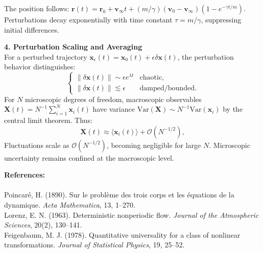 \begin{technical}
The position follows: $\mathbf{r}(t) = \mathbf{r}_0 + \mathbf{v}_\infty t + (m/\gamma)(\mathbf{v}_0 - \mathbf{v}_\infty)(1 - e^{-\gamma t/m})$. Perturbations decay exponentially with time constant $\tau = m/\gamma$, suppressing initial differences.

\textbf{4. Perturbation Scaling and Averaging}\\
For a perturbed trajectory $\mathbf{x}_\epsilon(t) = \mathbf{x}_0(t) + \epsilon \delta \mathbf{x}(t)$, the perturbation behavior distinguishes:
\[
\begin{cases}
\|\delta \mathbf{x}(t)\| \sim \epsilon e^{\lambda t} & \text{chaotic,} \\[0.5em]
\|\delta \mathbf{x}(t)\| \lesssim \epsilon & \text{damped/bounded.}
\end{cases}
\]
For $N$ microscopic degrees of freedom, macroscopic observables $\mathbf{X}(t) = N^{-1} \sum_{i=1}^N \mathbf{x}_i(t)$ have variance $\mathrm{Var}(\mathbf{X}) \sim N^{-1} \mathrm{Var}(\mathbf{x}_i)$ by the central limit theorem. Thus:
\[
\mathbf{X}(t) \approx \langle \mathbf{x}_i(t) \rangle + \mathcal{O}(N^{-1/2}),
\]
Fluctuations scale as $\mathcal{O}(N^{-1/2})$, becoming negligible for large $N$. Microscopic uncertainty remains confined at the macroscopic level.

\textbf{References:}\\
{\footnotesize  \\
Poincaré, H. (1890). Sur le problème des trois corps et les équations de la dynamique. \textit{Acta Mathematica}, 13, 1–270.\\
Lorenz, E. N. (1963). Deterministic nonperiodic flow. \textit{Journal of the Atmospheric Sciences}, 20(2), 130–141.\\
Feigenbaum, M. J. (1978). Quantitative universality for a class of nonlinear transformations. \textit{Journal of Statistical Physics}, 19, 25–52.
}
\end{technical}
